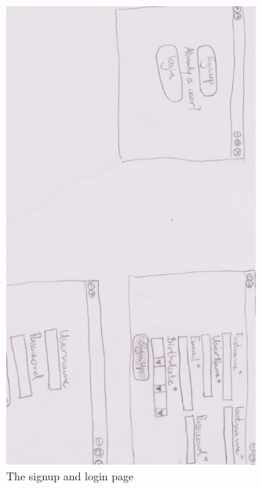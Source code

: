 \begin{figure}[!ht]
  \centering
    \includegraphics[width=0.75\textwidth]{Parts/Appendix/Images/PaperMockup/LoginSignup}
  \caption{The signup and login page}
  \label{fig:Appendix_GUI_sketches_LoginSignup}
\end{figure}

